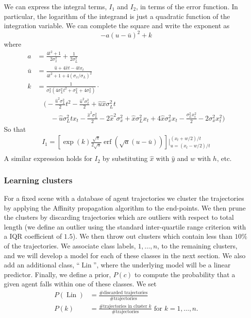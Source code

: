\documentclass[12pt]{amsart}
\DeclareMathOperator{\Lin}{Lin}
\DeclareMathOperator{\erf}{erf}
\begin{document}
We can express the integral terms, $I_1$ and $I_2$, in terms of the error function.
In particular, the logarithm of the integrand is just a quadratic function of the integration variable.
We can complete the square and write the exponent as
$$
	 - a( u - \bar{u} )^2 + k
$$
where
\begin{align*}
	a &= \frac{4t^2+1}{2 \sigma_x^2} + \frac{1}{2\sigma_L^2} \\
	\bar{u} &= \frac{\hat{u} + 4 \hat{x} t - 4 t x_t }{4 t^2 + 1 + 4(\sigma_x / \sigma_L)^2} \\
	k &= \frac{1}{\sigma_{x}^{2} \left(4 \sigma_{L}^{2} t^{2} + \sigma_{L}^{2} + 4 \sigma_{x}^{2}\right)} \cdot \\
	&\quad \Big(- \frac{\hat{u}^{2} \sigma_{L}^{2}}{2} t^{2} - \frac{\hat{u}^{2} \sigma_{x}^{2}}{2} + \hat{u} \hat{x} \sigma_{L}^{2} t \\
	&\qquad - \hat{u} \sigma_{L}^{2} t x_{t} - \frac{\hat{x}^{2} \sigma_{L}^{2}}{2} - 2 \hat{x}^{2} \sigma_{x}^{2} + \hat{x} \sigma_{L}^{2} x_{t} + 4 \hat{x} \sigma_{x}^{2} x_{t} - \frac{\sigma_{L}^{2} x_{t}^{2}}{2} - 2 \sigma_{x}^{2} x_{t}^{2}\Big)
\end{align*}
So that
\begin{align*}
	I_1 = \left[ \exp(k) \frac{ \sqrt{\pi}}{2 \sqrt{ a } } \erf( \sqrt{a} (u - \bar{u}) ) \right] \Big|_{u= (x_t-w/2)/t}^{(x_t+w/2)/t}\\
\end{align*}
A similar expression holds for $I_2$ by substituting $\hat{x}$ with $\hat{y}$ and $w$ with $h$, etc.

\subsubsection{Learning clusters}
For a fixed scene with a database of agent trajectories we cluster the trajectories by applying the Affinity propagation algorithm to the end-points.
We then prune the clusters by discarding trajectories which are outliers with respect to total length (we define an outlier using the standard inter-quartile range criterion with a IQR coefficient of $1.5$).
We then throw out clusters which contain less than $10\%$ of the trajectories.
We associate class labels, $1,\dots,n$,  to the remaining clusters, and we will develop a model for each of these classes in the next section.
We also add an additional class, ``$\Lin$'', where the underlying model will be a linear predictor.
Finally, we define a prior, $P(c)$ to compute the probability that a given agent falls within one of these classes.
We set 
\begin{align*}
	P(\Lin) &= \frac{ \text{\# discarded trajectories} }{ \text{ \# trajectories } } \\
	P(k) &= \frac{ \text{\# trajectories in cluster $k$} }{ \text{ \# trajectories } } \text{ for } k=1,\dots,n.
\end{align*}
\end{document}
